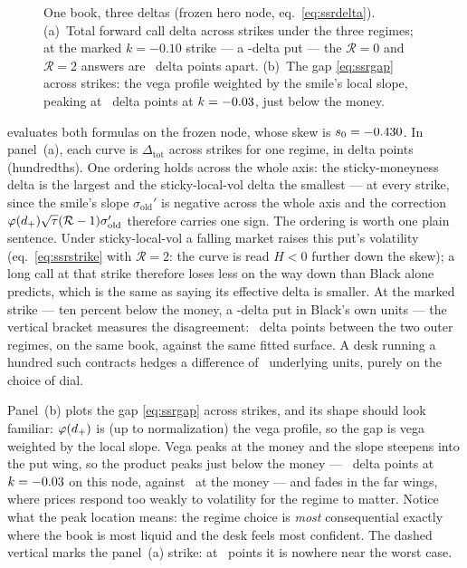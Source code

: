 \begin{figure}[htbp]
\centering
{}
\caption{One book, three deltas (frozen hero node,
eq.~\eqref{eq:ssrdelta}).  (a)~Total forward call delta across strikes
under the three regimes; at the marked $k=-0.10$ strike --- a
\MacSsrDeltaMarkPutDelta-delta put --- the $\mathcal{R}=0$ and
$\mathcal{R}=2$ answers are \MacSsrDeltaGapPts\ delta points apart.
(b)~The gap \eqref{eq:ssrgap} across strikes: the vega profile
weighted by the smile's local slope, peaking at \MacSsrDeltaMaxPts\
delta points at $k=-0.03$, just below the money.}
\label{fig:ssrdelta}
\end{figure}

 evaluates both formulas on the frozen node, whose
skew is $s_0=-0.430$.  In panel~(a), each curve is
$\Delta_{\mathrm{tot}}$ across strikes for one regime, in delta points
(hundredths).  One ordering holds across the whole axis:
the sticky-moneyness delta is the largest and the sticky-local-vol
delta the smallest --- at every strike, since the smile's slope
$\sigma_{\mathrm{old}}'$ is negative across the whole axis and the
correction $\varphi(d_+)\sqrt{\tau}(\mathcal{R}-1)\sigma_{\mathrm{old}}'$
therefore carries one sign.  The ordering is worth one plain sentence.  Under sticky-local-vol a falling market raises this put's
volatility (eq.~\eqref{eq:ssrstrike} with $\mathcal{R}=2$: the
curve is read $H<0$ further down the skew); a long call at that
strike therefore loses
less on the way down than Black alone predicts, which is the same as
saying its effective delta is smaller.  At the marked strike --- ten
percent below the money, a \MacSsrDeltaMarkPutDelta-delta put in
Black's own units --- the vertical bracket measures the disagreement:
\MacSsrDeltaGapPts\ delta points between the two outer regimes, on the
same book, against the same fitted surface.  A desk running a hundred
such contracts hedges a difference of \MacSsrDeltaGapPts\ underlying
units, purely on the choice of dial.

Panel~(b) plots the gap \eqref{eq:ssrgap} across strikes, and its
shape should look familiar: $\varphi(d_+)$ is (up to normalization) the
vega profile, so the gap is vega weighted by the local slope.  Vega
peaks at the money and the slope steepens into the put wing, so the
product peaks just below the money --- \MacSsrDeltaMaxPts\ delta
points at $k=-0.03$ on this node, against
\MacSsrDeltaAtmPts\ at the money --- and
fades in the far wings, where prices respond too weakly to volatility
for the regime to matter.  Notice what the peak location means: the
regime choice is \emph{most} consequential exactly where the book is
most liquid and the desk feels most confident.  The dashed vertical
marks the panel~(a) strike: at \MacSsrDeltaGapPts\ points it is
nowhere near the worst case.

